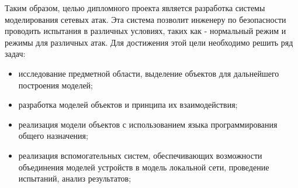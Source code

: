     Таким образом, целью дипломного проекта является разработка системы моделирования сетевых атак. Эта система позволит инженеру по безопасности проводить испытания в различных условиях, таких как - нормальный режим и режимы для различных атак. Для достижения этой цели необходимо решить ряд задач:

\begin{itemize}
    \item исследование предметной области, выделение объектов для дальнейшего построения моделей;
    \item разработка моделей объектов и принципа их взаимодействия;
    \item реализация модели объектов с использованием языка программирования общего назначения;
    \item реализация вспомогательных систем, обеспечивающих возможности объединения моделей устройств в модель локальной сети, проведение испытаний, анализ результатов; 
\end{itemize}   
